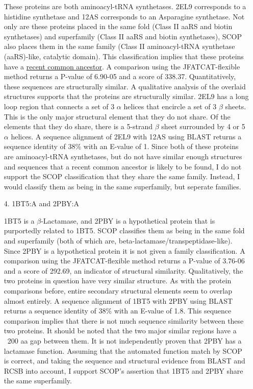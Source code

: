 \documentclass[11pt]{article}
\begin{document}
\begin{itemize}
These proteins are both aminoacyl-tRNA synthetases. 2EL9 corresponds to a histidine 
synthetase and 12AS corresponds to an Asparagine synthetase. Not only are these 
proteins placed in the same fold (Class II aaRS and biotin synthetases) and superfamily (Class II aaRS and biotin synthetases), SCOP also places them in the same family 
(Class II aminoacyl-tRNA synthetase (aaRS)-like, catalytic domain).
This classification implies that these proteins have a \href{http://en.wikipedia.org/wiki/Structural_Classification_of_Proteins_database}{recent common ancestor}.
A comparison using the JFATCAT-flexible 
method returns a P-value of 6.90-05 and a score of 338.37. 
Quantitatively, these sequences are structurally similar.
A qualitative analysis of the overlaid structures supports that the proteins
are structurally similar. 2EL9 has a long loop region that connects a set of 3 $\alpha$ helices that 
encircle a set of 3 $\beta$ sheets. This is the only major structural element that they do not
share. Of the elements that they do share, there is a 5-strand $\beta$ sheet surrounded by 4 or 5 
$\alpha$ helices.
A sequence alignment of
2EL9 with 12AS using BLAST returns a sequence identity of 38\% with an E-value of 1. 
Since both of these proteins are aminoacyl-tRNA synthetases, but do not have similar enough structures and sequences
that a recent common ancestor is likely to be found, I do not support the SCOP classification that they share the same family.
Instead, I would classify them as being in the same superfamily, but seperate families.

\item[4.] 1BT5:A and 2PBY:A

1BT5 is a $\beta$-Lactamase, and 2PBY is a hypothetical protein that is purportedly related 
to 1BT5. SCOP classifies them as being in the same fold and superfamily (both of which are,
beta-lactamase/transpeptidase-like). Since 2PBY is a hypothetical protein it is not 
given a family classification. A comparison using the JFATCAT-flexible 
method returns a P-value of 3.76-06 and a score of 292.69, an indicator of structural similarity.
Qualitatively, the two proteins in question have very similar structure. As with the protein
comparisons before, entire secondary structural elements seem to overlap almost entirely. 
A sequence alignment of
1BT5 with 2PBY using BLAST returns a sequence identity of 38\% with an E-value of 1.8. This sequence
comparison implies that there is not much sequence similarity between these two proteins. It should be
noted that the two major similar regions have a ~200 aa gap between them. It is not independently proven 
that 2PBY has a lactamase function. Assuming that the automated function match by SCOP is correct, and taking the
sequence and structural evidence from BLAST and RCSB into account, I support SCOP's assertion that 
1BT5 and 2PBY share the same superfamily.
 


\end{itemize}
\end{document}
